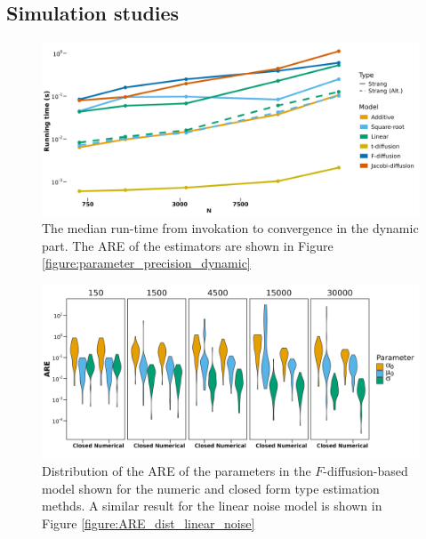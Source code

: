 \subsection{Simulation studies}
\begin{figure}[h!]
    \begin{center}
    \includegraphics[scale = .1]{figures/estimation_duration_dynamic.jpeg}
    \caption{The median run-time from invokation to convergence in the dynamic part. The ARE of the estimators are shown in Figure \ref{figure:parameter_precision_dynamic}}
    \label{figure:estimation_duration_dynamic}
    \end{center}
\end{figure}

\begin{figure}[h!]
    \begin{center}
    \includegraphics[scale = .1]{figures/ARE_dist_result_plot_F.jpeg}
    \caption{Distribution of the ARE of the parameters in the $F$-diffusion-based model shown for the numeric and closed form type estimation methds. A similar result for the linear noise model is shown in Figure \ref{figure:ARE_dist_linear_noise}}
    \label{figure:ARE_dist_numeric_F_diffusion}
    \end{center}
\end{figure}


